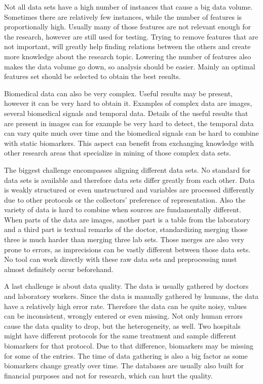 \documentclass[10pt,a4paper]{article}
\begin{document}
	Not all data sets have a high number of instances that cause a big data volume. Sometimes there are relatively few instances, while the number of features is proportionally high.\cite{dubitzky2007fundamentals} Usually many of those features are not relevant enough for the research, however are still used for testing. Trying to remove features that are not important, will greatly help finding relations between the others and create more knowledge about the research topic. Lowering the number of features also makes the data volume go down, so analysis should be easier. Mainly an optimal features set should be selected to obtain the best results.\cite{PENG201015}
	
	Biomedical data can also be very complex. Useful results may be present, however it can be very hard to obtain it. Examples of complex data are images, several biomedical signals and temporal data. Details of the useful results that are present in images can for example be very hard to detect, the temporal data can vary quite much over time and the biomedical signals can be hard to combine with static biomarkers.\cite{Yoo2012} This aspect can benefit from exchanging knowledge with other research areas that specialize in mining of those complex data sets.\cite{Turkay2014, bellazzi2011data}
	
	The biggest challenge encompasses aligning different data sets. No standard for data sets is available and therefore data sets differ greatly from each other. Data is weakly structured or even unstructured\cite{Holzinger2014} and variables are processed differently due to other protocols or the collectors' preference of representation.\cite{Otasek2014} Also the variety of data is hard to combine when sources are fundamentally different. When parts of the data are images, another part is a table from the laboratory and a third part is textual remarks of the doctor, standardizing merging those three is much harder than merging three lab sets. Those merges are also very prone to errors, as imprecisions can be vastly different between those data sets. No tool can work directly with these raw data sets and preprocessing must almost definitely occur beforehand.\cite{Turkay2014, CIOS20021}
	
	A last challenge is about data quality. The data is usually gathered by doctors and laboratory workers. Since the data is manually gathered by humans, the data have a relatively high error rate. Therefore the data can be quite noisy, values can be inconsistent, wrongly entered or even missing.\cite{CIOS20021} Not only human errors cause the data quality to drop, but the heterogeneity, as well. Two hospitals might have different protocols for the same treatment and sample different biomarkers for that protocol. Due to that difference, biomarkers may be missing for some of the entries. The time of data gathering is also a big factor as some biomarkers change greatly over time. The databases are usually also built for financial purposes and not for research, which can hurt the quality.\cite{Yoo2012}
	
\end{document}
